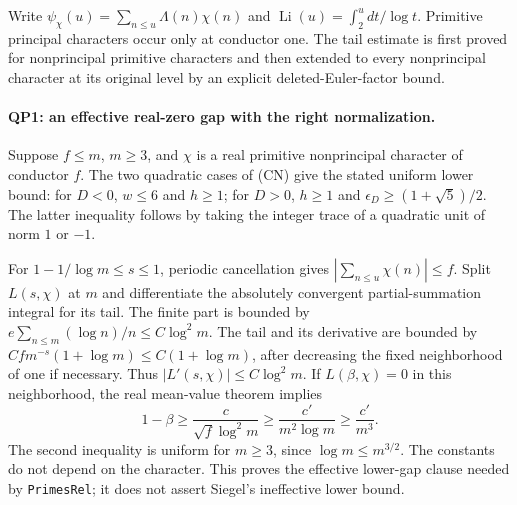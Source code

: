 Write $\psi_\chi(u)=\sum_{n\le u}\Lambda(n)\chi(n)$ and
$\operatorname{Li}(u)=\int_2^u dt/\log t$.  Primitive principal characters
occur only at conductor one.  The tail estimate is first proved for
nonprincipal primitive characters and then extended to every nonprincipal
character at its original level by an explicit deleted-Euler-factor bound.

\paragraph{QP1: an effective real-zero gap with the right normalization.}
Suppose $f\le m$, $m\ge3$, and $\chi$ is a real primitive nonprincipal
character of conductor $f$.  The two quadratic cases of (CN) give the
stated uniform lower bound: for $D<0$, $w\le6$ and $h\ge1$; for $D>0$,
$h\ge1$ and $\epsilon_D\ge(1+\sqrt5)/2$.  The latter inequality follows
by taking the integer trace of a quadratic unit of norm $1$ or $-1$.

For $1-1/\log m\le s\le1$, periodic cancellation gives
$|\sum_{n\le u}\chi(n)|\le f$.  Split $L(s,\chi)$ at $m$ and differentiate
the absolutely convergent partial-summation integral for its tail.
The finite part is bounded by
$e\sum_{n\le m}(\log n)/n\le C\log^2m$.
The tail and its derivative are bounded by
$Cf m^{-s}(1+\log m)\le C(1+\log m)$, after decreasing the fixed
neighborhood of one if necessary.  Thus $|L'(s,\chi)|\le C\log^2m$.
If $L(\beta,\chi)=0$ in this neighborhood, the real mean-value theorem
implies
\[
 1-\beta\ge \frac{c}{\sqrt f\log^2m}
       \ge\frac{c'}{m^2\log m}\ge\frac{c'}{m^3}.       \tag{QP.1}
\]
The second inequality is uniform for $m\ge3$, since
$\log m\le m^{3/2}$.  The constants do not depend on the character.
This proves the effective lower-gap clause needed by
\texttt{PrimesRel}; it does not assert Siegel's ineffective lower bound.


